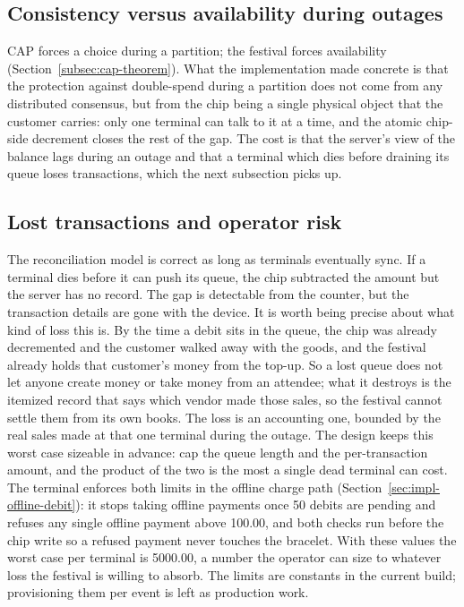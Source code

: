 \subsection{Consistency versus availability during outages}
\label{subsec:cap-tradeoff}

CAP forces a choice during a partition; the festival forces availability (Section~\ref{subsec:cap-theorem}). What the implementation made concrete is that the protection against double-spend during a partition does not come from any distributed consensus, but from the chip being a single physical object that the customer carries: only one terminal can talk to it at a time, and the atomic chip-side decrement closes the rest of the gap. The cost is that the server's view of the balance lags during an outage and that a terminal which dies before draining its queue loses transactions, which the next subsection picks up.

\subsection{Lost transactions and operator risk}
\label{subsec:lost-tx-risk}

The reconciliation model is correct as long as terminals eventually sync. If a terminal dies before it can push its queue, the chip subtracted the amount but the server has no record. The gap is detectable from the counter, but the transaction details are gone with the device. It is worth being precise about what kind of loss this is. By the time a debit sits in the queue, the chip was already decremented and the customer walked away with the goods, and the festival already holds that customer's money from the top-up. So a lost queue does not let anyone create money or take money from an attendee; what it destroys is the itemized record that says which vendor made those sales, so the festival cannot settle them from its own books. The loss is an accounting one, bounded by the real sales made at that one terminal during the outage. The design keeps this worst case sizeable in advance: cap the queue length and the per-transaction amount, and the product of the two is the most a single dead terminal can cost. The terminal enforces both limits in the offline charge path (Section~\ref{sec:impl-offline-debit}): it stops taking offline payments once 50 debits are pending and refuses any single offline payment above 100.00, and both checks run before the chip write so a refused payment never touches the bracelet. With these values the worst case per terminal is 5000.00, a number the operator can size to whatever loss the festival is willing to absorb. The limits are constants in the current build; provisioning them per event is left as production work.

